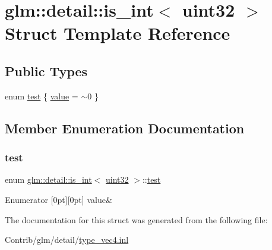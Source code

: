 \hypertarget{structglm_1_1detail_1_1is__int_3_01uint32_01_4}{}\section{glm\+:\+:detail\+:\+:is\+\_\+int$<$ uint32 $>$ Struct Template Reference}
\label{structglm_1_1detail_1_1is__int_3_01uint32_01_4}
\subsection*{Public Types}
\begin{DoxyCompactItemize}
\item 
enum \mbox{\hyperlink{structglm_1_1detail_1_1is__int_3_01uint32_01_4_a8930e3fe143b2eb718be340178475095}{test}} \{ \mbox{\hyperlink{structglm_1_1detail_1_1is__int_3_01uint32_01_4_a8930e3fe143b2eb718be340178475095a33d5c966994a88b96988fb1085e9530c}{value}} = $\sim$0
 \}
\end{DoxyCompactItemize}


\subsection{Member Enumeration Documentation}
\mbox{\label{structglm_1_1detail_1_1is__int_3_01uint32_01_4_a8930e3fe143b2eb718be340178475095}} 
\subsubsection{\texorpdfstring{test}{test}}
{\footnotesize\ttfamily enum \mbox{\hyperlink{structglm_1_1detail_1_1is__int}{glm\+::detail\+::is\+\_\+int}}$<$ \mbox{\hyperlink{namespaceglm_1_1detail_ade6cfbf377022aaa391af8cd50489222}{uint32}} $>$\+::\mbox{\hyperlink{structglm_1_1detail_1_1is__int_3_01uint32_01_4_a8930e3fe143b2eb718be340178475095}{test}}}

\begin{DoxyEnumFields}{Enumerator}
[0pt][0pt]{}\mbox{\label{structglm_1_1detail_1_1is__int_3_01uint32_01_4_a8930e3fe143b2eb718be340178475095a33d5c966994a88b96988fb1085e9530c}} 
value&\\
\hline

\end{DoxyEnumFields}


The documentation for this struct was generated from the following file\+:\begin{DoxyCompactItemize}
\item 
Contrib/glm/detail/\mbox{\hyperlink{type__vec4_8inl}{type\+\_\+vec4.\+inl}}\end{DoxyCompactItemize}
